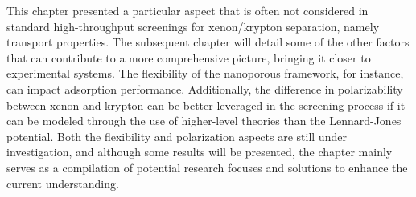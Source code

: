 \documentclass[main]{subfiles}
\begin{document}
This chapter presented a particular aspect that is often not considered in standard high-throughput screenings for xenon/krypton separation, namely transport properties. The subsequent chapter will detail some of the other factors that can contribute to a more comprehensive picture, bringing it closer to experimental systems. The flexibility of the nanoporous framework, for instance, can impact adsorption performance.\autocite{Witman_2017} Additionally, the difference in polarizability between xenon and krypton can be better leveraged in the screening process if it can be modeled through the use of higher-level theories than the Lennard-Jones potential. Both the flexibility and polarization aspects are still under investigation, and although some results will be presented, the chapter mainly serves as a compilation of potential research focuses and solutions to enhance the current understanding.

\OnlyInSubfile{\printglobalbibliography}
\end{document}
